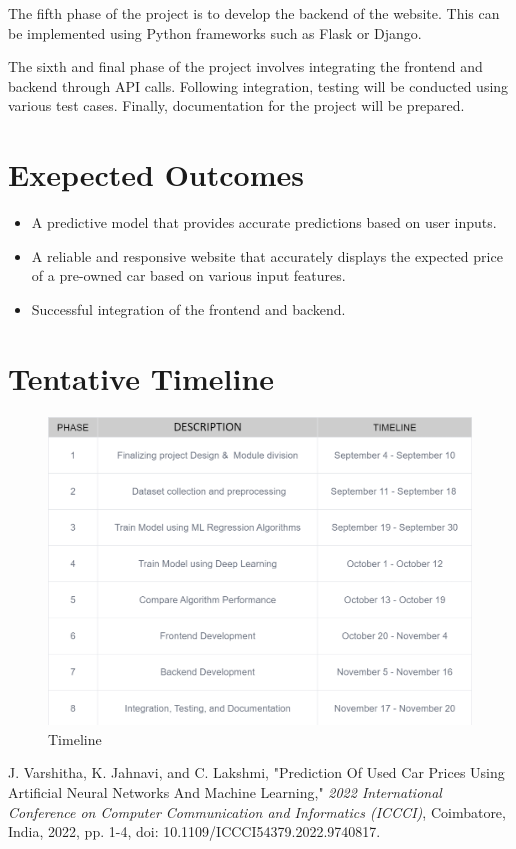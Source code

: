 \documentclass[a4paper,12pt]{article}
\begin{document}
\begin{justify}
The fifth phase of the project is to develop the backend of the website. This can be implemented using Python frameworks such as Flask or Django.
\newline

The sixth and final phase of the project involves integrating the frontend and backend through API calls. Following integration, testing will be conducted using various test cases. Finally, documentation for the project will be prepared.

\newpage
\section*{Exepected Outcomes}
	\begin{itemize}
		\item A predictive model that provides accurate predictions based on user inputs.
		\item A reliable and responsive website that accurately displays the expected price of a pre-owned car based on various input features.
		\item Successful integration of the frontend and backend.

	 \end{itemize}

\section*{Tentative Timeline}
\begin{figure}[h]
    \centering
    \includegraphics[width=.8\textwidth]{./timeline.png}
    \caption{Timeline}
    \label{fig:your-s}
\end{figure}


\begin{thebibliography}{9}
J. Varshitha, K. Jahnavi, and C. Lakshmi, "Prediction Of Used Car Prices Using Artificial Neural Networks And Machine Learning," \textit{2022 International Conference on Computer Communication and Informatics (ICCCI)}, Coimbatore, India, 2022, pp. 1-4, doi: 10.1109/ICCCI54379.2022.9740817.



\end{thebibliography}
\end{justify}
\end{document}
